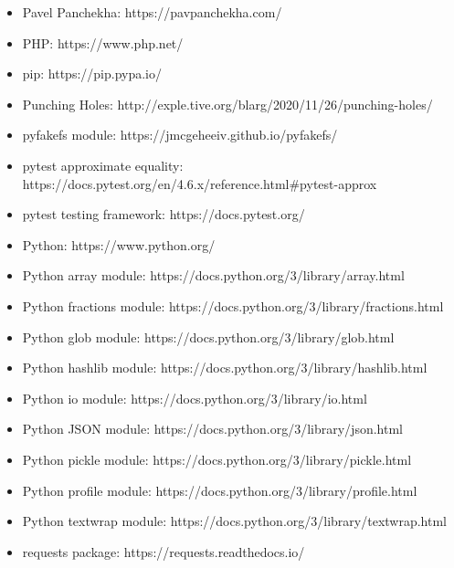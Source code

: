 \documentclass{scrbook}
\begin{document}
\begin{itemize}
\item Pavel Panchekha: https://pavpanchekha.com/

\item PHP: https://www.php.net/

\item pip: https://pip.pypa.io/

\item Punching Holes: http://exple.tive.org/blarg/2020/11/26/punching-holes/

\item pyfakefs module: https://jmcgeheeiv.github.io/pyfakefs/

\item pytest approximate equality: https://docs.pytest.org/en/4.6.x/reference.html\#pytest-approx

\item pytest testing framework: https://docs.pytest.org/

\item Python: https://www.python.org/

\item Python array module: https://docs.python.org/3/library/array.html

\item Python fractions module: https://docs.python.org/3/library/fractions.html

\item Python glob module: https://docs.python.org/3/library/glob.html

\item Python hashlib module: https://docs.python.org/3/library/hashlib.html

\item Python io module: https://docs.python.org/3/library/io.html

\item Python JSON module: https://docs.python.org/3/library/json.html

\item Python pickle module: https://docs.python.org/3/library/pickle.html

\item Python profile module: https://docs.python.org/3/library/profile.html

\item Python textwrap module: https://docs.python.org/3/library/textwrap.html

\item requests package: https://requests.readthedocs.io/


\end{itemize}
\end{document}
